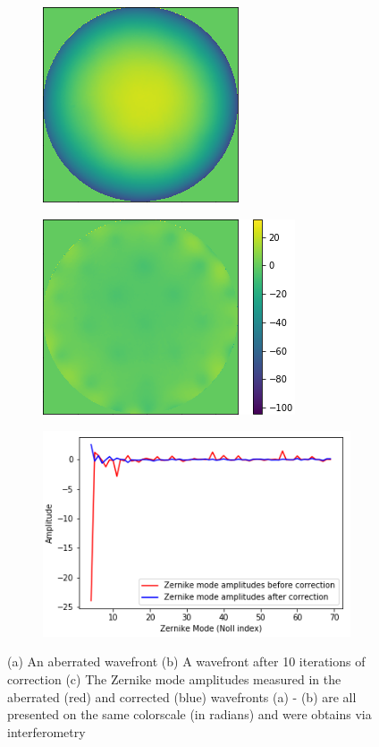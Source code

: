 \begin{figure}[h]
	\centering
	\begin{subfigure}{0.33\textwidth}
		\includegraphics[scale=2]{./images/aberrated_wavefront_defocus_ptt_rmv_crop_phase_only.png}
		\caption{}
		\label{fig:aberrated_wavefront_defocus_ptt_rmv_crop_phase_only}
	\end{subfigure}
	\begin{subfigure}{0.425\textwidth}
		\includegraphics[scale=2]{./images/flattened_wavefront_10it_ptt_rmv_phase_colorbar1.png}
		\caption{}
		\label{fig:flattened_wavefront_10it}
	\end{subfigure}

	\begin{subfigure}{0.5\textwidth}
		\includegraphics[scale=2]{./images/zernike_amps_before_and_after_10it_modes_4to69.png}
		\caption{}
		\label{fig:zernike_modes_to_show_flattening}
	\end{subfigure}
	\caption{(a) An aberrated wavefront (b) A wavefront after 10 iterations of correction (c) The Zernike mode amplitudes measured in the aberrated (red) and corrected (blue) wavefronts (a) - (b) are all presented on the same colorscale (in radians) and were obtains via interferometry}
	\label{fig:direct_wavefront_correction}
\end{figure}

